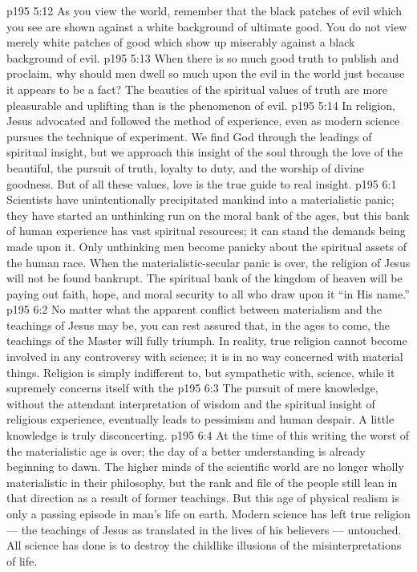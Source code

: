 \vs p195 5:12 \pc As you view the world, remember that the black patches of evil which you see are shown against a white background of ultimate good. You do not view merely white patches of good which show up miserably against a black background of evil.
\vs p195 5:13 When there is so much good truth to publish and proclaim, why should men dwell so much upon the evil in the world just because it appears to be a fact? The beauties of the spiritual values of truth are more pleasurable and uplifting than is the phenomenon of evil.
\vs p195 5:14 \pc In religion, Jesus advocated and followed the method of experience, even as modern science pursues the technique of experiment. We find God through the leadings of spiritual insight, but we approach this insight of the soul through the love of the beautiful, the pursuit of truth, loyalty to duty, and the worship of divine goodness. But of all these values, love is the true guide to real insight.
\vs p195 6:1 Scientists have unintentionally precipitated mankind into a materialistic panic; they have started an unthinking run on the moral bank of the ages, but this bank of human experience has vast spiritual resources; it can stand the demands being made upon it. Only unthinking men become panicky about the spiritual assets of the human race. When the materialistic\hyp{}secular panic is over, the religion of Jesus will not be found bankrupt. The spiritual bank of the kingdom of heaven will be paying out faith, hope, and moral security to all who draw upon it “in His name.”
\vs p195 6:2 No matter what the apparent conflict between materialism and the teachings of Jesus may be, you can rest assured that, in the ages to come, the teachings of the Master will fully triumph. In reality, true religion cannot become involved in any controversy with science; it is in no way concerned with material things. Religion is simply indifferent to, but sympathetic with, science, while it supremely concerns itself with the 
\vs p195 6:3 The pursuit of mere knowledge, without the attendant interpretation of wisdom and the spiritual insight of religious experience, eventually leads to pessimism and human despair. A little knowledge is truly disconcerting.
\vs p195 6:4 At the time of this writing the worst of the materialistic age is over; the day of a better understanding is already beginning to dawn. The higher minds of the scientific world are no longer wholly materialistic in their philosophy, but the rank and file of the people still lean in that direction as a result of former teachings. But this age of physical realism is only a passing episode in man’s life on earth. Modern science has left true religion --- the teachings of Jesus as translated in the lives of his believers --- untouched. All science has done is to destroy the childlike illusions of the misinterpretations of life.
